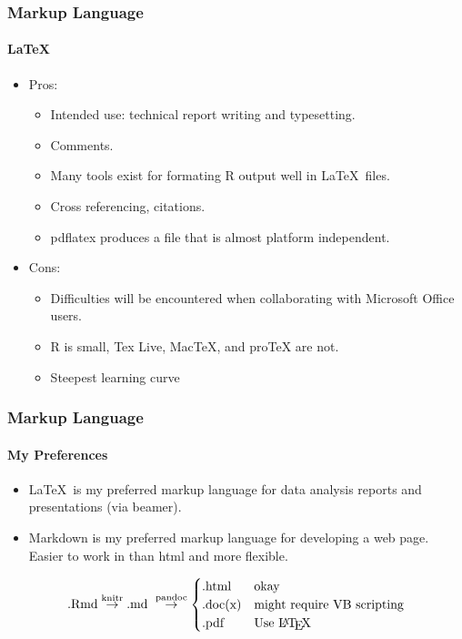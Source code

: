 \documentclass[t]{beamer}\usepackage[]{graphicx}\usepackage[]{color}
\begin{document}
\begin{frame}
  \frametitle{Markup Language}
  \framesubtitle{\LaTeX}
  \begin{itemize}
    \item Pros: 
      \begin{itemize}
        \item Intended use: technical report writing and typesetting.
        \item Comments.
        \item Many tools exist for formating R output well in \LaTeX\ files.
        \item Cross referencing, citations.
        \item pdflatex produces a file that is almost platform independent.
      \end{itemize}

    \item Cons:
      \begin{itemize}
        \item Difficulties will be encountered  when collaborating with
          Microsoft Office users.
        \item R is small,  Tex Live, MacTeX, and proTeX are not.
        \item Steepest learning curve
      \end{itemize}
  \end{itemize} 
\end{frame}

\begin{frame}
  \frametitle{Markup Language}
  \framesubtitle{My Preferences}
  \begin{itemize}
    \item \LaTeX\ is my preferred markup language for data analysis reports and
      presentations (via beamer).

    \item Markdown is my preferred markup language for developing a web page.
      Easier to work in than html and more flexible.

  \end{itemize} 

  \[ 
  \text{.Rmd} \stackrel{\text{knitr}}{\rightarrow} 
  \text{.md } \stackrel{\text{pandoc}}{\rightarrow} 
  \begin{cases} 
        \text{.html} & \text{okay} \\
        \text{.doc(x)} & \text{might require VB scripting} \\
        \text{.pdf}  & \text{Use \LaTeX} 
      \end{cases}\]

\end{frame}
\end{document}
